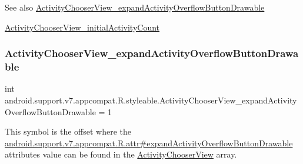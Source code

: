 \begin{DoxySeeAlso}{See also}
\hyperlink{classandroid_1_1support_1_1v7_1_1appcompat_1_1R_1_1styleable_a42b0a0f293b2f899ebe89cd182dca36f}{Activity\+Chooser\+View\+\_\+expand\+Activity\+Overflow\+Button\+Drawable} 

\hyperlink{classandroid_1_1support_1_1v7_1_1appcompat_1_1R_1_1styleable_ab6826b784285f4584f4c664422674559}{Activity\+Chooser\+View\+\_\+initial\+Activity\+Count} 
\end{DoxySeeAlso}
\mbox{\label{classandroid_1_1support_1_1v7_1_1appcompat_1_1R_1_1styleable_a42b0a0f293b2f899ebe89cd182dca36f}} 
\subsubsection{\texorpdfstring{Activity\+Chooser\+View\+\_\+expand\+Activity\+Overflow\+Button\+Drawable}{ActivityChooserView\_expandActivityOverflowButtonDrawable}}
{\footnotesize\ttfamily int android.\+support.\+v7.\+appcompat.\+R.\+styleable.\+Activity\+Chooser\+View\+\_\+expand\+Activity\+Overflow\+Button\+Drawable = 1\hspace{0.3cm}{\ttfamily [static]}}

This symbol is the offset where the \hyperlink{classandroid_1_1support_1_1v7_1_1appcompat_1_1R_1_1attr_a804ae4660db47a214095c80b7b7a5735}{android.\+support.\+v7.\+appcompat.\+R.\+attr\#expand\+Activity\+Overflow\+Button\+Drawable} attribute\textquotesingle{}s value can be found in the \hyperlink{classandroid_1_1support_1_1v7_1_1appcompat_1_1R_1_1styleable_a982c115fab0715899d54b7816a21cc47}{Activity\+Chooser\+View} array.

